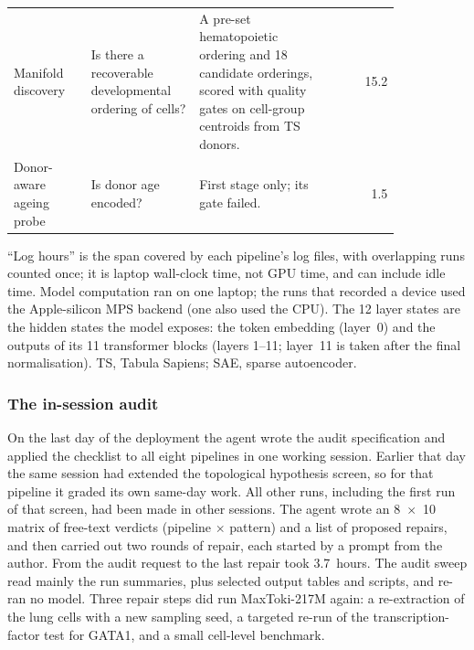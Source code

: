\documentclass[10pt,letterpaper]{article}
\begin{document}
{\begin{longtable}{@{}p{0.20\linewidth}p{0.28\linewidth}p{0.36\linewidth}r@{}}
Manifold discovery & Is there a recoverable developmental ordering of
cells? & A pre-set hematopoietic ordering and 18 candidate orderings,
scored with quality gates on cell-group centroids from TS donors. & 15.2 \\
Donor-aware ageing probe & Is donor age encoded? & First stage only; its
gate failed. & 1.5 \\
\end{longtable}
\begin{flushleft}
``Log
hours'' is the span covered by each pipeline's log files, with
overlapping runs counted once; it is laptop wall-clock time, not GPU
time, and can include idle time. Model computation ran on one laptop;
the runs that recorded a device used the Apple-silicon MPS backend (one
also used the CPU). The 12 layer states are the hidden states the model
exposes: the token embedding (layer~0) and the outputs of its 11
transformer blocks (layers 1--11; layer~11 is taken after the final
normalisation). TS, Tabula Sapiens; SAE, sparse autoencoder.
\end{flushleft}
}


\subsubsection*{The in-session audit}
On the last day of the deployment the agent wrote the audit specification
and applied the checklist to all eight pipelines in one working session.
Earlier that day the same session had extended the topological hypothesis
screen, so for that pipeline it graded its own same-day work. All other
runs, including the first run of that screen, had been made in other
sessions. The agent wrote an 8~$\times$~10
matrix of free-text verdicts (pipeline $\times$ pattern) and a list of
proposed repairs, and then carried out two rounds of repair, each started
by a prompt from the author. From the audit request to the last repair
took 3.7~hours. The audit sweep read mainly the run summaries, plus
selected output tables and scripts, and re-ran no model. Three repair
steps did run MaxToki-217M again: a re-extraction of the lung cells with a
new sampling seed, a targeted re-run of the transcription-factor test for
GATA1, and a small cell-level benchmark.
\end{document}
